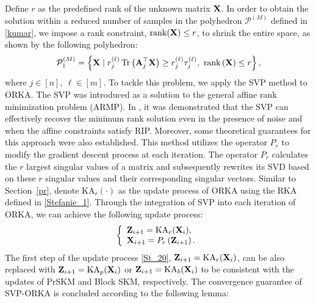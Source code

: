 \documentclass[12pt,draftcls,onecolumn]{IEEEtran}
\begin{document}
Define $r$ 
as the predefined rank 
of the unknown matrix $\mathbf{X}$.
In order to obtain the solution within a reduced number of samples in the polyhedron $\mathcal{P}^{(M)}$ defined in \eqref{kumar}, we impose 
a rank constraint, $\operatorname{rank}(\mathbf{X})\leq r$,
to shrink the entire space, as shown by the following polyhedron:
\begin{equation}
\label{Stefanie_5}
\mathcal{P}^{(M)}_1=\left\{\mbX \mid r^{(\ell)}_{j}\operatorname{Tr}\left(\mbA^{\top}_j\mbX\right)\geq r^{(\ell)}_{j}\tau^{(\ell)}_{j},~ \operatorname{rank}\left(\mbX\right)\leq r\right\},
\end{equation}\normalsize
where $j\in[n],~\ell \in [m]$. To tackle this problem, we apply the SVP method to ORKA. The SVP was introduced as a solution to the general affine rank minimization problem (ARMP). In \cite{jain2010guaranteed}, it was demonstrated that the SVP can effectively recover the minimum rank solution even in the presence of noise and when the affine constraints satisfy RIP. Moreover, some theoretical guarantees for this approach were also established. This method utilizes the operator
$P_{r}$ %
to modify the gradient descent process at each iteration. The operator $P_{r}$ 
calculates the $r$ largest singular values of a matrix and subsequently rewrites its SVD based on these $r$ singular values and their corresponding singular vectors. Similar to Section~\ref{pr}, denote $\mathrm{KA}_r(\cdot)$ as the update process of ORKA using the RKA defined in \eqref{Stefanie_1}. Through the integration of SVP into each iteration of ORKA, we can achieve the following update process:
\begin{equation}
\label{St_20}
\left\{\begin{array}{l}
\mbZ_{i+1}=\mathrm{KA}_{r}(\mbX_i),\\
\mbX_{i+1}=P_{r}\left(\mbZ_{i+1}\right).
\end{array}\right.
\end{equation}\normalsize
The first step of the update process \eqref{St_20}, $\mathbf{Z}_{i+1}=\mathrm{KA}_{r}(\mathbf{X}_i)$, can be also replaced with $\mathbf{Z}_{i+1}=\mathrm{KA}_{p}(\mathbf{X}_i)$ or $\mathbf{Z}_{i+1}=\mathrm{KA}_{b}(\mathbf{X}_i)$ to be consistent with the updates of PrSKM and Block SKM, respectively. The convergence guarantee of SVP-ORKA is concluded according to the following lemma:
\end{document}
